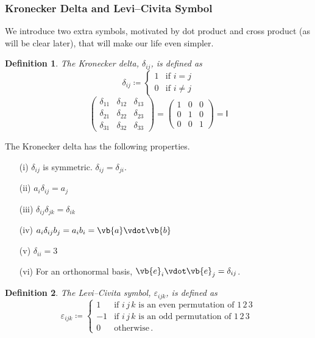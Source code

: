 \documentclass{article}
\theoremstyle{plain}\theoremheaderfont{\normalfont\itshape}\theorembodyfont{\rmfamily}\theoremseparator{.}\newtheorem*{rem}{Remark}\newtheorem*{ex}{Example}\newtheorem*{proof}{Proof}\newtheorem*{altp}{Alternative proof}
\theoremstyle{plain}\theoremheaderfont{\normalfont\bfseries}\theorembodyfont{\rmfamily}\theoremseparator{.}\newtheorem{thm}{Theorem}[section]\newtheorem{lem}[thm]{Lemma}\newtheorem{prop}[thm]{Proposition}\newtheorem*{cor}{Corollary}\newtheorem{defn}[thm]{Definition}\newtheorem{clm}[thm]{Claim}\newtheorem{clminproof}{Claim}
\theoremstyle{break}\theoremheaderfont{\normalfont\itshape}\theorembodyfont{\rmfamily}\theoremseparator{.\medskip}\newtheorem*{proofskip}{Proof}\newtheorem*{exs}{Examples}\newtheorem*{rems}{Remarks}
\theoremstyle{break}\theoremheaderfont{\normalfont\bfseries}\theorembodyfont{\rmfamily}\theoremseparator{.\medskip}\newtheorem{lemskip}[thm]{Lemma}\newtheorem{defnskip}[thm]{Definition}\newtheorem{propskip}[thm]{Proposition}\newtheorem{thmskip}[thm]{Theorem}
\numberwithin{equation}{section}
\begin{document}
	\subsubsection{Kronecker Delta and Levi--Civita Symbol}
	We introduce two extra symbols, motivated by dot product and cross product (as will be clear later), that will make our life even simpler.
	\begin{defn}
		The \textit{Kronecker delta}, \(\delta_{ij}\), is defined as
		\[\delta_{ij}\coloneqq\begin{cases}
			1 & \text{if }i=j\\
			0 & \text{if }i\ne j
		\end{cases}\]
		\[\begin{pmatrix}
			\delta_{11} & \delta_{12} &\delta_{13}\\
			\delta_{21} & \delta_{22} &\delta_{23}\\
			\delta_{31} & \delta_{32} &\delta_{33}
		\end{pmatrix}=\begin{pmatrix}
			1 & 0 & 0\\
			0 & 1 & 0\\
			0 & 0 & 1
		\end{pmatrix}
		=\mathsf{I}\]
	\end{defn}
	The Kronecker delta has the following properties.
	\begin{enumerate}[topsep=0pt,label=(\roman*)]
		\item[(i)] \(\delta_{ij}\) is symmetric. \(\delta_{ij}=\delta_{ji}\).
		\item[(ii)] \(a_{i}\delta_{ij}=a_{j}\)
		\item[(iii)] \(\delta_{ij}\delta_{jk}=\delta_{ik}\)
		\item[(iv)] \(a_i\delta_{ij}b_j=a_ib_i=\vb{a}\vdot\vb{b}\)
		\item[(v)] \(\delta_{ii}=3\)
		\item[(vi)] For an orthonormal basis, \(\vb{e}_i\vdot\vb{e}_j=\delta_{ij}\).
	\end{enumerate}

	\begin{defn}
		The \textit{Levi--Civita symbol}, \(\varepsilon_{ijk}\), is defined as
		\[\varepsilon_{ijk}\coloneqq\begin{cases}
			1 & \text{if }i\,j\,k\text{ is an even permutation of }1\,2\,3\\
			-1 & \text{if }i\,j\,k\text{ is an odd permutation of }1\,2\,3\\
			0 & \text{otherwise}\,.
		\end{cases}\]
	\end{defn}
	
\end{document}
